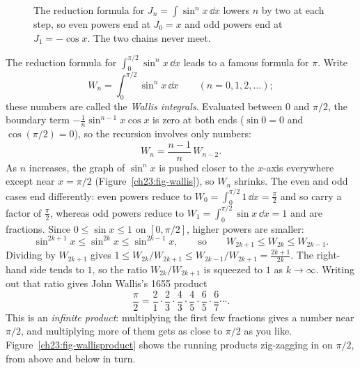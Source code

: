 \begin{figure}[htbp]
\centering
{}
\caption{The reduction formula for $J_n = \int\sin^n x\,\dd x$ lowers $n$ by two at
each step, so even powers end at $J_0 = x$ and odd powers end at
$J_1 = -\cos x$. The two chains never meet.}
\label{ch23:fig-parity}
\end{figure}

\begin{connectionbox}
The reduction formula for $\int_0^{\pi/2}\sin^n x\,\dd x$ leads to a famous
formula for $\pi$. Write
\[
W_n = \int_0^{\pi/2}\sin^n x\,\dd x \qquad (n = 0, 1, 2, \dots);
\]
these numbers are called the \emph{Wallis integrals}. Evaluated between $0$ and
$\pi/2$, the boundary term $-\frac1n\sin^{n-1}x\cos x$ is zero at both ends
($\sin 0 = 0$ and $\cos(\pi/2) = 0$), so the recursion involves only numbers:
\[
W_n = \frac{n-1}{n}\,W_{n-2}.
\]
As
$n$ increases, the graph of $\sin^n x$ is pushed closer to the $x$-axis
everywhere except near $x=\pi/2$ (Figure~\ref{ch23:fig-wallis}), so $W_n$ shrinks.
The even and odd cases end differently: even powers reduce to
$W_0 = \int_0^{\pi/2} 1\,\dd x = \frac{\pi}{2}$ and so carry a factor of $\frac{\pi}{2}$,
whereas odd powers reduce to $W_1 = \int_0^{\pi/2}\sin x\,\dd x = 1$ and are
fractions. Since $0\le\sin x\le 1$ on $[0,\pi/2]$, higher powers are smaller:
\[
\sin^{2k+1}x \le \sin^{2k}x \le \sin^{2k-1}x,
\qquad\text{so}\qquad
W_{2k+1} \le W_{2k} \le W_{2k-1}.
\]
Dividing by $W_{2k+1}$ gives $1 \le W_{2k}/W_{2k+1} \le W_{2k-1}/W_{2k+1} = \frac{2k+1}{2k}$.
The right-hand side tends to $1$, so the ratio $W_{2k}/W_{2k+1}$
is squeezed to $1$ as $k\to\infty$. Writing out that ratio gives John
Wallis's 1655 product
\[
\frac{\pi}{2} = \frac{2}{1}\cdot\frac{2}{3}\cdot\frac{4}{3}\cdot\frac{4}{5}
\cdot\frac{6}{5}\cdot\frac{6}{7}\cdots.
\]
This is an \emph{infinite product}: multiplying the first few fractions gives a
number near $\pi/2$, and multiplying more of them gets as close to $\pi/2$ as you
like. Figure~\ref{ch23:fig-wallisproduct} shows the running products zig-zagging
in on $\pi/2$, from above and below in turn.
\end{connectionbox}

